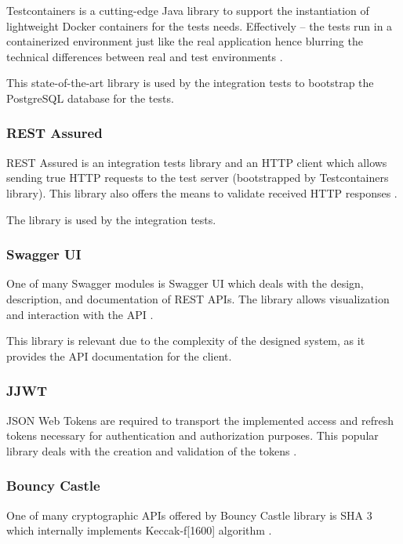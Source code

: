 \documentclass[a4paper,twoside,12pt]{book}
\begin{document}
Testcontainers is a cutting-edge Java library to support the instantiation of lightweight Docker containers for the tests needs. Effectively – the tests run in a containerized environment just like the real application hence blurring the technical differences between real and test environments \cite{bib:testcontainers}.

This state-of-the-art library is used by the integration tests to bootstrap the PostgreSQL database for the tests.

\subsubsection{REST Assured}

REST Assured is an integration tests library and an HTTP client which allows sending true HTTP requests to the test server (bootstrapped by Testcontainers library). This library also offers the means to validate received HTTP responses \cite{bib:rest_assured}.

The library is used by the integration tests.

\subsubsection{Swagger UI}

One of many Swagger modules is Swagger UI which deals with the design, description, and documentation of REST APIs. The library allows visualization and interaction with the API \cite{bib:swagger, bib:swagger_blog}.

This library is relevant due to the complexity of the designed system, as it provides the API documentation for the client.

\subsubsection{JJWT}

JSON Web Tokens are required to transport the implemented access and refresh tokens necessary for authentication and authorization purposes. This popular library deals with the creation and validation of the tokens \cite{bib:jjwt}.

\subsubsection{Bouncy Castle}

One of many cryptographic APIs offered by Bouncy Castle library is SHA 3 which internally implements Keccak-f[1600] algorithm \cite{bib:bouncy_castle}.
\end{document}
